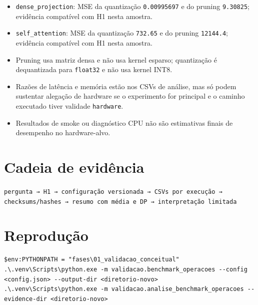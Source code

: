 \begin{itemize}
\item \texttt{dense\_\allowbreak{}projection}: MSE da quantização \texttt{0.\allowbreak{}00995697} e do pruning \texttt{9.\allowbreak{}30825}; evidência compatível com H1 nesta amostra.
\item \texttt{self\_\allowbreak{}attention}: MSE da quantização \texttt{732.\allowbreak{}65} e do pruning \texttt{12144.\allowbreak{}4}; evidência compatível com H1 nesta amostra.
\item Pruning usa matriz densa e não usa kernel esparso; quantização é dequantizada para \texttt{float32} e não usa kernel INT8.
\item Razões de latência e memória estão nos CSVs de análise, mas só podem sustentar alegação de hardware se o experimento for principal e o caminho executado tiver validade \texttt{hardware}.
\item Resultados de smoke ou diagnóstico CPU não são estimativas finais de desempenho no hardware-alvo.
\end{itemize}


\section{Cadeia de evidência}



\texttt{pergunta → H1 → configuração versionada → CSVs por execução → checksums/\allowbreak{}hashes → resumo com média e DP → interpretação limitada}



\section{Reprodução}



\begin{Verbatim}[fontsize=\small,breaklines=true,label=powershell]
$env:PYTHONPATH = "fases\01_validacao_conceitual"
.\.venv\Scripts\python.exe -m validacao.benchmark_operacoes --config <config.json> --output-dir <diretorio-novo>
.\.venv\Scripts\python.exe -m validacao.analise_benchmark_operacoes --evidence-dir <diretorio-novo>
\end{Verbatim}
